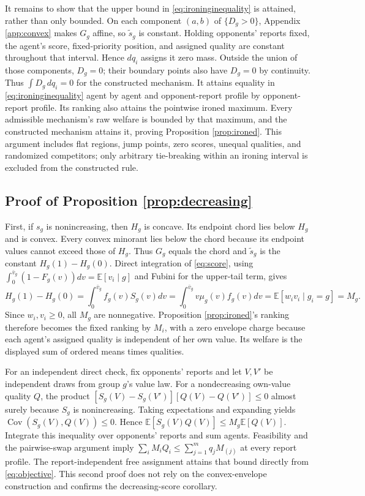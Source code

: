 \documentclass[11pt]{article}
\newcommand{\E}{\mathbb E}
\begin{document}
It remains to show that the upper bound in \eqref{eq:ironinginequality} is attained, rather than only bounded. On each component $(a,b)$ of $\{D_g>0\}$, Appendix \ref{app:convex} makes $G_g$ affine, so $\widetilde s_g$ is constant. Holding opponents' reports fixed, the agent's score, fixed-priority position, and assigned quality are constant throughout that interval. Hence $dq_i$ assigns it zero mass. Outside the union of those components, $D_g=0$; their boundary points also have $D_g=0$ by continuity. Thus $\int D_g\,dq_i=0$ for the constructed mechanism. It attains equality in \eqref{eq:ironinginequality} agent by agent and opponent-report profile by opponent-report profile. Its ranking also attains the pointwise ironed maximum. Every admissible mechanism's raw welfare is bounded by that maximum, and the constructed mechanism attains it, proving Proposition \ref{prop:ironed}. This argument includes flat regions, jump points, zero scores, unequal qualities, and randomized competitors; only arbitrary tie-breaking within an ironing interval is excluded from the constructed rule.

\subsection{Proof of Proposition \ref{prop:decreasing}}\label{app:decreasing}

First, if $s_g$ is nonincreasing, then $H_g$ is concave. Its endpoint chord lies below $H_g$ and is convex. Every convex minorant lies below the chord because its endpoint values cannot exceed those of $H_g$. Thus $G_g$ equals the chord and $\widetilde s_g$ is the constant $H_g(1)-H_g(0)$. Direct integration of \eqref{eq:score}, using $\int_0^{\bar v_g}(1-F_g(v))dv=\E[v_i\mid g]$ and Fubini for the upper-tail term, gives
\[
H_g(1)-H_g(0)=\int_0^{\bar v_g}f_g(v)S_g(v)dv
=\int_0^{\bar v_g}v\mu_g(v)f_g(v)dv
=\E[w_i v_i\mid g_i=g]=M_g.
\]
Since $w_i,v_i\ge0$, all $M_g$ are nonnegative. Proposition \ref{prop:ironed}'s ranking therefore becomes the fixed ranking by $M_i$, with a zero envelope charge because each agent's assigned quality is independent of her own value. Its welfare is the displayed sum of ordered means times qualities.

For an independent direct check, fix opponents' reports and let $V,V'$ be independent draws from group $g$'s value law. For a nondecreasing own-value quality $Q$, the product $[S_g(V)-S_g(V')][Q(V)-Q(V')]\le0$ almost surely because $S_g$ is nonincreasing. Taking expectations and expanding yields $\operatorname{Cov}(S_g(V),Q(V))\le0$. Hence $\E[S_g(V)Q(V)]\le M_g\E[Q(V)]$. Integrate this inequality over opponents' reports and sum agents. Feasibility and the pairwise-swap argument imply $\sum_iM_iQ_i\le\sum_{j=1}^m q_jM_{(j)}$ at every report profile. The report-independent free assignment attains that bound directly from \eqref{eq:objective}. This second proof does not rely on the convex-envelope construction and confirms the decreasing-score corollary.
\end{document}
